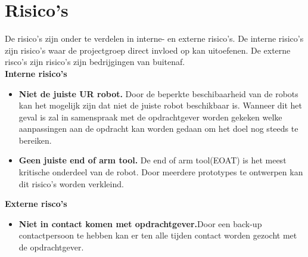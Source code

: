 \section{Risico's}

De risico's zijn onder te verdelen in interne- en externe risico's. De interne risico's zijn risico's waar de projectgroep direct invloed op kan uitoefenen. De externe risco's zijn risico's zijn bedrijgingen van buitenaf. \\[0.5cm]



\textbf{Interne risico's}
\begin{itemize}
	\item \textbf{Niet de juiste UR robot.} Door de beperkte beschibaarheid van de robots kan het mogelijk zijn dat niet de juiste robot beschikbaar is. Wanneer dit het geval is zal in samenspraak met de opdrachtgever worden gekeken welke aanpassingen aan de opdracht kan worden gedaan om het doel nog steeds te bereiken.
	\item \textbf{Geen juiste end of arm tool.} De end of arm tool(EOAT) is het meest kritische onderdeel van de robot. Door meerdere prototypes te ontwerpen kan dit risico's worden verkleind. 
\end{itemize}

\textbf{Externe risco's}
\begin{itemize}
	\item \textbf{Niet in contact komen met opdrachtgever.}Door een back-up contactpersoon te hebben kan er ten alle tijden contact worden gezocht met de opdrachtgever.
\end{itemize}



\newpage 
